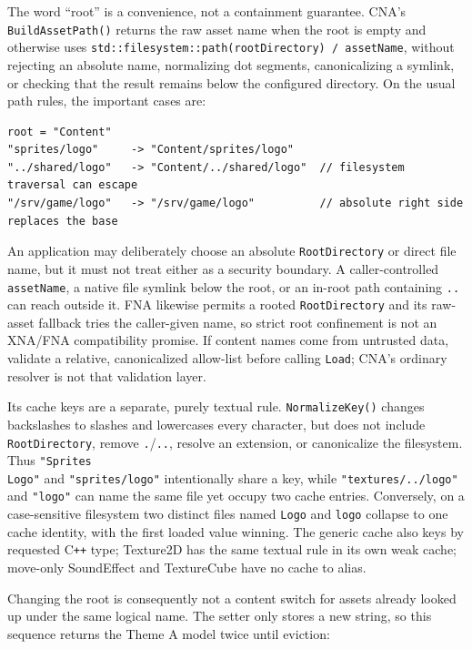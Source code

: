 The word ``root'' is a convenience, not a containment guarantee. CNA's
\texttt{BuildAssetPath()} returns the raw asset name when the root is empty and otherwise uses
\texttt{std::filesystem::path(rootDirectory) / assetName}, without rejecting an absolute name,
normalizing dot segments, canonicalizing a symlink, or checking that the result remains below the
configured directory. On the usual path rules, the important cases are:

\begin{lstlisting}
root = "Content"
"sprites/logo"     -> "Content/sprites/logo"
"../shared/logo"   -> "Content/../shared/logo"  // filesystem traversal can escape
"/srv/game/logo"   -> "/srv/game/logo"          // absolute right side replaces the base
\end{lstlisting}

An application may deliberately choose an absolute \texttt{RootDirectory} or direct file name,
but it must not treat either as a security boundary. A caller-controlled \texttt{assetName}, a
native file symlink below the root, or an in-root path containing \texttt{..} can reach outside
it. FNA likewise permits a rooted \texttt{RootDirectory} and its raw-asset fallback tries the
caller-given name, so strict root confinement is not an XNA/FNA compatibility promise. If content
names come from untrusted data, validate a relative, canonicalized allow-list before calling
\texttt{Load}; CNA's ordinary resolver is not that validation layer.

Its cache keys are a separate, purely textual rule. \texttt{NormalizeKey()} changes backslashes
to slashes and lowercases every character, but does not include \texttt{RootDirectory}, remove
\texttt{.}/\texttt{..}, resolve an extension, or canonicalize the filesystem. Thus
\texttt{"Sprites\\Logo"} and \texttt{"sprites/logo"} intentionally share a key, while
\texttt{"textures/../logo"} and \texttt{"logo"} can name the same file yet occupy two cache
entries. Conversely, on a case-sensitive filesystem two distinct files named \texttt{Logo} and
\texttt{logo} collapse to one cache identity, with the first loaded value winning. The generic
cache also keys by requested C\texttt{++} type; Texture2D has the same textual rule in its own
weak cache; move-only SoundEffect and TextureCube have no cache to alias.

Changing the root is consequently not a content switch for assets already looked up under the
same logical name. The setter only stores a new string, so this sequence returns the Theme A
model twice until eviction:

